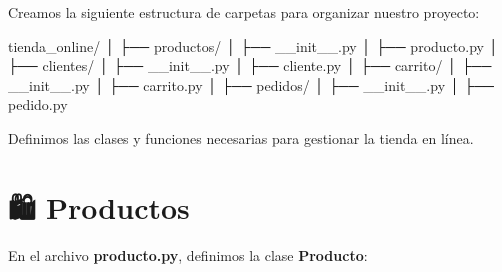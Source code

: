 \documentclass[
  a4paper,
  DIV=11,
  numbers=noendperiod,
  onepage,
  openany]{scrreprt}
\newenvironment{Shaded}{\begin{snugshade}}{\end{snugshade}}
\newcommand{\CommentTok}[1]{\textcolor[rgb]{0.37,0.37,0.37}{#1}}
\newcommand{\ControlFlowTok}[1]{\textcolor[rgb]{0.00,0.23,0.31}{\textbf{#1}}}
\newcommand{\FunctionTok}[1]{\textcolor[rgb]{0.28,0.35,0.67}{#1}}
\newcommand{\KeywordTok}[1]{\textcolor[rgb]{0.00,0.23,0.31}{\textbf{#1}}}
\newcommand{\NormalTok}[1]{\textcolor[rgb]{0.00,0.23,0.31}{#1}}
\newcommand{\OperatorTok}[1]{\textcolor[rgb]{0.37,0.37,0.37}{#1}}
\newcommand{\SpecialCharTok}[1]{\textcolor[rgb]{0.37,0.37,0.37}{#1}}
\newcommand{\SpecialStringTok}[1]{\textcolor[rgb]{0.13,0.47,0.30}{#1}}
\newcommand{\VariableTok}[1]{\textcolor[rgb]{0.07,0.07,0.07}{#1}}
\begin{document}
Creamos la siguiente estructura de carpetas para organizar nuestro
proyecto:

\begin{Shaded}
\begin{Highlighting}[]
\NormalTok{tienda\_online/}
\NormalTok{│}
\NormalTok{├── productos/}
\NormalTok{│   ├── \_\_init\_\_.py}
\NormalTok{│   ├── producto.py}
\NormalTok{│}
\NormalTok{├── clientes/}
\NormalTok{│   ├── \_\_init\_\_.py}
\NormalTok{│   ├── cliente.py}
\NormalTok{│}
\NormalTok{├── carrito/}
\NormalTok{│   ├── \_\_init\_\_.py}
\NormalTok{│   ├── carrito.py}
\NormalTok{│}
\NormalTok{├── pedidos/}
\NormalTok{│   ├── \_\_init\_\_.py}
\NormalTok{│   ├── pedido.py}
\end{Highlighting}
\end{Shaded}

Definimos las clases y funciones necesarias para gestionar la tienda en
línea.

\section{🛍️ Productos}\label{productos}

En el archivo \textbf{producto.py}, definimos la clase
\textbf{Producto}:

\begin{Shaded}
\end{Shaded}
\end{document}
